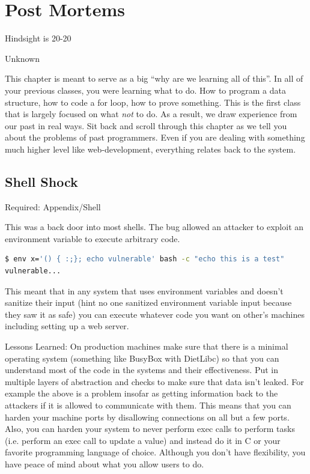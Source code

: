 \chapter{Post Mortems}

\epigraph{Hindsight is 20-20}{Unknown}

This chapter is meant to serve as a big ``why are we learning all of this''.
In all of your previous classes, you were learning what to do.
How to program a data structure, how to code a for loop, how to prove something.
This is the first class that is largely focused on what \textit{not} to do.
As a result, we draw experience from our past in real ways.
Sit back and scroll through this chapter as we tell you about the problems of past programmers.
Even if you are dealing with something much higher level like web-development, everything relates back to the system.

\section{Shell Shock}
\label{pm:shellshock}

Required: Appendix/Shell

This was a back door into most shells.
The bug allowed an attacker to exploit an environment variable to execute arbitrary code.

\begin{lstlisting}[language=bash]
$ env x='() { :;}; echo vulnerable' bash -c "echo this is a test"
vulnerable...
\end{lstlisting}

This meant that in any system that uses environment variables and doesn't sanitize their input (hint no one sanitized environment variable input because they saw it as safe) you can execute whatever code you want on other's machines including setting up a web server.

Lessons Learned: On production machines make sure that there is a minimal operating system (something like BusyBox with DietLibc) so that you can understand most of the code in the systems and their effectiveness.
Put in multiple layers of abstraction and checks to make sure that data isn't leaked.
For example the above is a problem insofar as getting information back to the attackers if it is allowed to communicate with them.
This means that you can harden your machine ports by disallowing connections on all but a few ports.
Also, you can harden your system to never perform exec calls to perform tasks (i.e. perform an exec call to update a value) and instead do it in C or your favorite programming language of choice.
Although you don't have flexibility, you have peace of mind about what you allow users to do.

